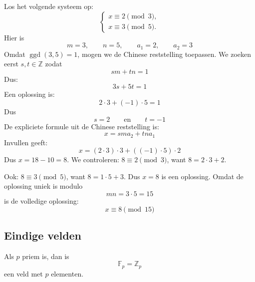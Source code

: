\textbf{} Los het volgende systeem op:
\begin{equation*}
    \begin{cases}
            x\equiv 2 \pmod 3,\\
            x\equiv 3 \pmod 5.
        \end{cases}
\end{equation*}
Hier is
\begin{equation*}
    m=3,\qquad n=5,\qquad a_1=2,\qquad a_2=3
\end{equation*}
Omdat $\operatorname{ggd}(3,5)=1$, mogen we de Chinese reststelling toepassen. We zoeken eerst $s,t\in\mathbb{Z}$ zodat
\begin{equation*}
    sm+tn=1
\end{equation*}
Dus:
\begin{equation*}
    3s+5t=1
\end{equation*}
Een oplossing is:
\begin{equation*}
    2\cdot 3+(-1)\cdot 5=1
\end{equation*}
Dus
\begin{equation*}
    s=2 \qquad \text{en} \qquad t=-1
\end{equation*}
De expliciete formule uit de Chinese reststelling is:
\begin{equation*}
    x=sma_2+tna_1
\end{equation*}
Invullen geeft:
\begin{equation*}
    x=(2\cdot 3)\cdot 3+((-1)\cdot 5)\cdot 2
\end{equation*}
Dus $x=18-10=8$. We controleren: $8\equiv 2 \pmod 3$, want $8=2\cdot 3+2$.

Ook: $8\equiv 3 \pmod 5$, want $8=1\cdot 5+3$. Dus $x=8$ is een oplossing. Omdat de oplossing uniek is modulo
\begin{equation*}
    mn=3\cdot 5=15
\end{equation*}
is de volledige oplossing:
\begin{equation*}
    x\equiv 8 \pmod {15}
\end{equation*}

\subsection{Eindige velden}

Als $p$ priem is, dan is
\begin{equation*}
    \mathbb{F}_p = \mathbb{Z}_p
\end{equation*}
een veld met $p$ elementen.

